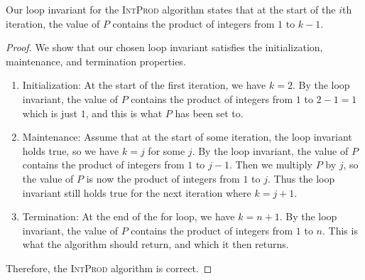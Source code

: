 \begin{example}
    Our loop invariant for the \textsc{IntProd} algorithm states that at the start of the $i$th iteration, the value of $P$ contains the product of integers from $1$ to $k-1$.

    \begin{proof}
        We show that our chosen loop invariant satisfies the initialization, maintenance, and termination properties.

    \begin{enumerate}
        \item Initialization: At the start of the first iteration, we have $k=2$. By the loop invariant, the value of $P$ contains the product of integers from $1$ to $2-1=1$ which is just $1$, and this is what $P$ has been set to.

        \item Maintenance: Assume that at the start of some iteration, the loop invariant holds true, so we have $k = j$ for some $j$. By the loop invariant, the value of $P$ contains the product of integers from $1$ to $j-1$. Then we multiply $P$ by $j$, so the value of $P$ is now the product of integers from $1$ to $j$. Thus the loop invariant still holds true for the next iteration where $k= j+1$.

        \item Termination: At the end of the for loop, we have $k = n+1$. By the loop invariant, the value of $P$ contains the product of integers from $1$ to $n$. This is what the algorithm should return, and which it then returns.
    \end{enumerate}

    Therefore, the \textsc{IntProd} algorithm is correct.
    \end{proof}
\end{example}

